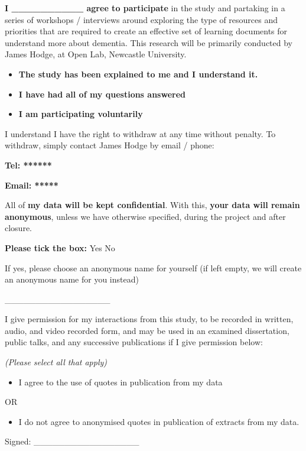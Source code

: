 \textbf{I \_\_\_\_\_\_\_\_\_\_ agree to participate} in the study and partaking in a series of workshops / interviews around exploring the type of resources and priorities that are required to create an effective set of learning documents for understand more about dementia. This research will be primarily conducted by James Hodge, at Open Lab, Newcastle University.

\begin{itemize}
    \item \textbf{The study has been explained to me and I understand it.}
    \item \textbf{I have had all of my questions answered}
    \item \textbf{I am participating voluntarily}
\end{itemize}

I understand I have the right to withdraw at any time without penalty. To withdraw, simply contact James Hodge by email / phone:

\textbf{Tel: ******}

\textbf{Email: *****}

All of \textbf{my data will be kept confidential}. With this, \textbf{your data will remain anonymous}, unless we have otherwise specified, during the project and after closure.

\textbf{Please tick the box:}
Yes     No

If yes, please choose an anonymous name for yourself (if left empty, we will
create an anonymous name for you instead)


\_\_\_\_\_\_\_\_\_\_\_\_\_\_\_\_\_

I give permission for my interactions from this study, to be recorded in written,
audio, and video recorded form, and may be used in an examined dissertation,
public talks, and any successive publications if I give permission below:

\textit{(Please select all that apply)
}\begin{itemize}
    \item I agree to the use of quotes in publication from my data
\end{itemize}
OR
\begin{itemize}
    \item I do not agree to anonymised quotes in publication of extracts from my data.
\end{itemize}


Signed: \_\_\_\_\_\_\_\_\_\_\_\_\_\_\_\_\_

\newpage
